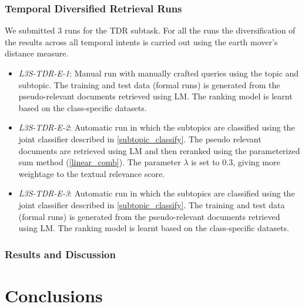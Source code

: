 \documentclass{sig-alternate}
\begin{document}
\subsubsection{Temporal Diversified Retrieval Runs}
We submitted 3 runs for the TDR subtask. For all the runs the diversification of the results across all temporal intents is carried out using the earth mover's distance measure.
\begin{itemize}
\item \textit{L3S-TDR-E-1}: Manual run with manually crafted queries using the topic and subtopic. The training and test data (formal runs) is generated from the pseudo-relevant documents retrieved using LM. The ranking model is learnt based on the class-specific datasets.
\item \textit{L3S-TDR-E-2}: Automatic run in which the subtopics are classified using the joint classifier described in \ref{subtopic_classify}. The pseudo relevant documents are retrieved using LM and then reranked using the parameterized sum method (\ref{linear_comb}). The parameter $\lambda$ is set to 0.3, giving more weightage to the textual relevance score.
\item \textit{L3S-TDR-E-3}: Automatic run in which the subtopics are classified using the joint classifier described in \ref{subtopic_classify}. The training and test data (formal runs) is generated from the pseudo-relevant documents retrieved using LM. The ranking model is learnt based on the class-specific datasets.
\end{itemize}
\subsubsection{Results and Discussion}
\section{Conclusions}





\end{document}
